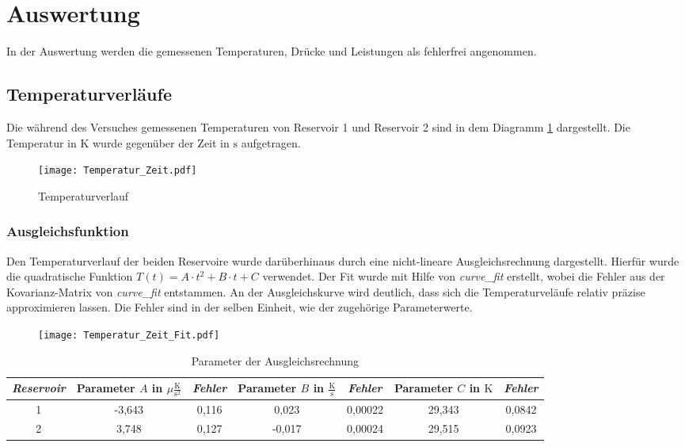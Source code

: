 \newpage
\section{Auswertung}
In der Auswertung werden die gemessenen Temperaturen, Drücke und Leistungen als fehlerfrei angenommen.
\subsection{Temperaturverläufe}
Die während des Versuches gemessenen Temperaturen von Reservoir 1 und Reservoir 2 sind in dem Diagramm \ref{fig:Temperaturverlauf} dargestellt.
Die Temperatur in $\si{\kelvin}$ wurde gegenüber der Zeit in $\si{\second}$ aufgetragen.
\begin{figure}
  \centering
  \texttt{[image: Temperatur\_Zeit.pdf]}
  \caption{Temperaturverlauf}
  \label{fig:Temperaturverlauf}
\end{figure}
\subsubsection{Ausgleichsfunktion}
Den Temperaturverlauf der beiden Reservoire wurde darüberhinaus durch eine nicht-lineare Ausgleichsrechnung dargestellt.
Hierfür wurde die quadratische Funktion $T(t) = A\cdot t^2 + B\cdot t + C$ verwendet. Der Fit wurde mit Hilfe von \textit{curve\_fit} erstellt, wobei die Fehler aus der Kovarianz-Matrix von \textit{curve\_fit} entstammen. An der Ausgleichskurve wird deutlich, dass sich die Temperaturveläufe relativ präzise approximieren lassen. Die Fehler sind in der selben Einheit, wie der zugehörige Parameterwerte.

\begin{figure}
  \centering
  \texttt{[image: Temperatur\_Zeit\_Fit.pdf]}
  \label{fig:Temperaturverlauf_Fit}
\end{figure}
\begin{table}
   \centering
   \caption{Parameter der Ausgleichsrechnung}
   \label{tab:Ausgleichsrechnung}
   \begin{tabular}[width=0.4\textwidth]{S[table-format=1.0] S[table-format=1.3] S[table-format=1.3] S[table-format=1.4] S[table-format=1.5] S[table-format=2.3] S[table-format=1.4]}
       \toprule
       {\footnotesize{\emph{Reservoir}}}  & {\footnotesize{Parameter} $A$ \footnotesize{in} $\mu\frac{\si{\kelvin}}{\si{\second}^2}$} & {\footnotesize{\emph{Fehler}}} & {\footnotesize{Parameter} $B$ \footnotesize{in}  $\frac{\si{\kelvin}}{\si{\second}}$} & {\footnotesize{\emph{Fehler}}} & {\footnotesize{Parameter} $C$ \footnotesize{in} $\si{\kelvin}$} & {\footnotesize{\emph{Fehler}}} \\
        & -3,643 & 0,116 & 0,023 & 0,00022 & 29,343 & 0,0842 \\
       2 & 3,748 & 0,127 & -0,017 & 0,00024 & 29,515 & 0,0923 \\
       \bottomrule
   \end{tabular}
\end{table}
\FloatBarrier
